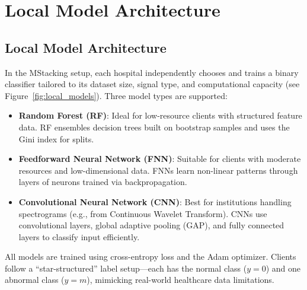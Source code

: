 \section{Local Model Architecture}

\subsection{Local Model Architecture}
\label{sec:local_model_architecture}

In the MStacking setup, each hospital independently chooses and trains a binary classifier tailored to its dataset size, signal type, and computational capacity (see Figure~\ref{fig:local_models}). Three model types are supported:

\begin{itemize}
    \item \textbf{Random Forest (RF)}: Ideal for low-resource clients with structured feature data. RF ensembles decision trees built on bootstrap samples and uses the Gini index for splits.
    
    \item \textbf{Feedforward Neural Network (FNN)}: Suitable for clients with moderate resources and low-dimensional data. FNNs learn non-linear patterns through layers of neurons trained via backpropagation.
    
    \item \textbf{Convolutional Neural Network (CNN)}: Best for institutions handling spectrograms (e.g., from Continuous Wavelet Transform). CNNs use convolutional layers, global adaptive pooling (GAP), and fully connected layers to classify input efficiently.
\end{itemize}

All models are trained using cross-entropy loss and the Adam optimizer. Clients follow a ``star-structured'' label setup—each has the normal class ($y=0$) and one abnormal class ($y=m$), mimicking real-world healthcare data limitations.

